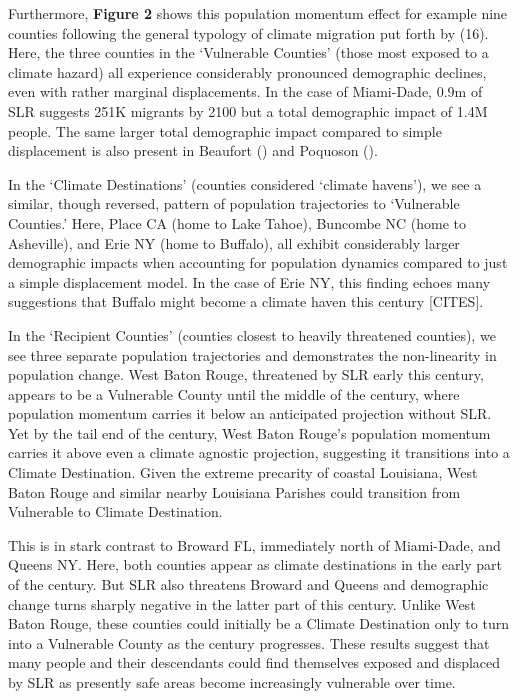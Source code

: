 \documentclass[9pt,twocolumn,twoside,]{pnas-new}
\begin{document}
Furthermore, \textbf{Figure 2} shows this population momentum effect for
example nine counties following the general typology of climate
migration put forth by (16). Here, the three counties in the `Vulnerable
Counties' (those most exposed to a climate hazard) all experience
considerably pronounced demographic declines, even with rather marginal
displacements. In the case of Miami-Dade, 0.9m of SLR suggests 251K
migrants by 2100 but a total demographic impact of 1.4M people. The same
larger total demographic impact compared to simple displacement is also
present in Beaufort () and Poquoson ().

In the `Climate Destinations' (counties considered `climate havens'), we
see a similar, though reversed, pattern of population trajectories to
`Vulnerable Counties.' Here, Place CA (home to Lake Tahoe), Buncombe NC
(home to Asheville), and Erie NY (home to Buffalo), all exhibit
considerably larger demographic impacts when accounting for population
dynamics compared to just a simple displacement model. In the case of
Erie NY, this finding echoes many suggestions that Buffalo might become
a climate haven this century {[}CITES{]}.

In the `Recipient Counties' (counties closest to heavily threatened
counties), we see three separate population trajectories and
demonstrates the non-linearity in population change. West Baton Rouge,
threatened by SLR early this century, appears to be a Vulnerable County
until the middle of the century, where population momentum carries it
below an anticipated projection without SLR. Yet by the tail end of the
century, West Baton Rouge's population momentum carries it above even a
climate agnostic projection, suggesting it transitions into a Climate
Destination. Given the extreme precarity of coastal Louisiana, West
Baton Rouge and similar nearby Louisiana Parishes could transition from
Vulnerable to Climate Destination.

This is in stark contrast to Broward FL, immediately north of
Miami-Dade, and Queens NY. Here, both counties appear as climate
destinations in the early part of the century. But SLR also threatens
Broward and Queens and demographic change turns sharply negative in the
latter part of this century. Unlike West Baton Rouge, these counties
could initially be a Climate Destination only to turn into a Vulnerable
County as the century progresses. These results suggest that many people
and their descendants could find themselves exposed and displaced by SLR
as presently safe areas become increasingly vulnerable over time.
\end{document}
